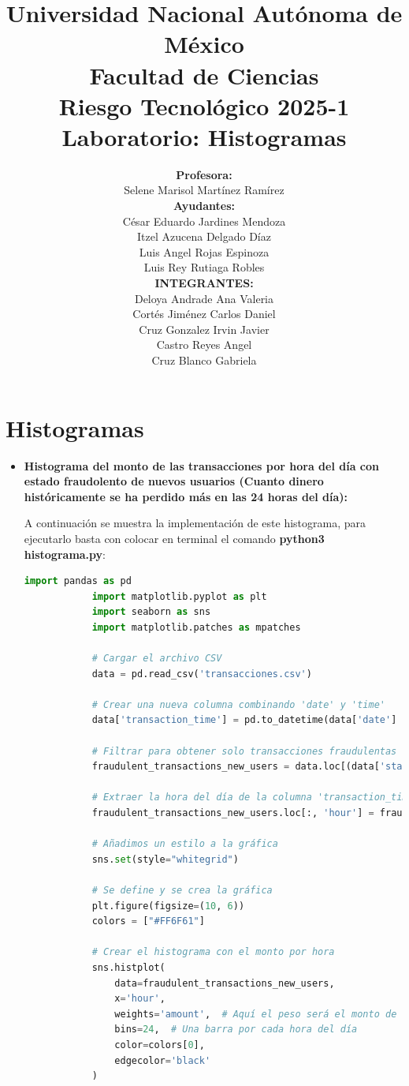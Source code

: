\documentclass{article}
\title{Universidad Nacional Autónoma de México \\\bigskip Facultad de Ciencias \\\bigskip Riesgo Tecnológico 2025-1 \\\bigskip \textbf{Laboratorio: Histogramas}}
\author{\textbf{Profesora:} \\\bigskip Selene Marisol Martínez Ramírez \\\bigskip \textbf{Ayudantes:} \\\bigskip  César Eduardo Jardines Mendoza \\\bigskip Itzel Azucena Delgado Díaz \\\bigskip Luis Angel Rojas Espinoza \\\bigskip Luis Rey Rutiaga Robles \\\bigskip \textbf{INTEGRANTES:} \\\bigskip Deloya Andrade Ana Valeria \\\bigskip Cortés Jiménez Carlos Daniel \\\bigskip Cruz Gonzalez Irvin Javier \\\bigskip Castro Reyes Angel \\\bigskip Cruz Blanco Gabriela}
\begin{document}
\maketitle

\newpage
 
\section{Histogramas}

\begin{itemize}
    \item \textbf{Histograma del monto de las transacciones por hora del día con estado fraudolento de nuevos usuarios (Cuanto dinero históricamente se ha perdido más en las 24 horas del día):}

        A continuación se muestra la implementación de este histograma, para ejecutarlo basta con colocar en terminal el comando \textbf{python3 histograma.py}:

        \begin{lstlisting}[language=Python, caption=Implementación del Histograma del monto de transacciones por hora del día]
            import pandas as pd
            import matplotlib.pyplot as plt
            import seaborn as sns
            import matplotlib.patches as mpatches
            
            # Cargar el archivo CSV
            data = pd.read_csv('transacciones.csv')
            
            # Crear una nueva columna combinando 'date' y 'time'
            data['transaction_time'] = pd.to_datetime(data['date'] + ' ' + data['time'], format='%d/%m/%Y %H:%M')
            
            # Filtrar para obtener solo transacciones fraudulentas de nuevos usuarios
            fraudulent_transactions_new_users = data.loc[(data['status'] == 'fraudulent') & (data['new_user'] == True)]
            
            # Extraer la hora del día de la columna 'transaction_time'
            fraudulent_transactions_new_users.loc[:, 'hour'] = fraudulent_transactions_new_users['transaction_time'].dt.hour
            
            # Añadimos un estilo a la gráfica
            sns.set(style="whitegrid")
            
            # Se define y se crea la gráfica
            plt.figure(figsize=(10, 6))
            colors = ["#FF6F61"]
            
            # Crear el histograma con el monto por hora
            sns.histplot(
                data=fraudulent_transactions_new_users,
                x='hour', 
                weights='amount',  # Aquí el peso será el monto de la transacción
                bins=24,  # Una barra por cada hora del día
                color=colors[0],
                edgecolor='black'
            )
            

\end{lstlisting}
\end{itemize}
\end{document}
